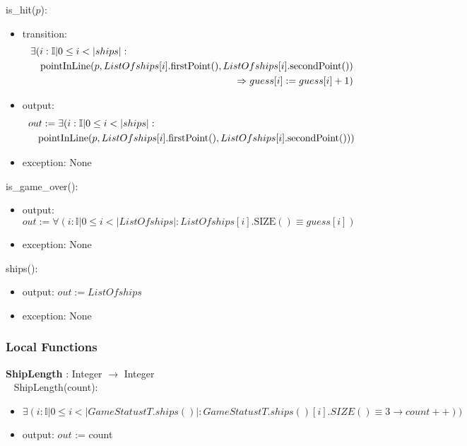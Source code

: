 \documentclass[12pt]{article}
\begin{document}
\noindent is\_hit($p$):
\begin{itemize}


\item transition:
\begin{eqnarray*}
\lefteqn{ \exists( i : \mathbb{I} | 0 \leq i < |ships| :} \\
& &    \mbox{pointInLine}(p, ListOfships[i].\mbox{firstPoint}(), ListOfships[i].\mbox{secondPoint}()) \\
& &    \Rightarrow guess[i] := guess[i] + 1)
\end{eqnarray*}

\item output:
\begin{eqnarray*}
\lefteqn{  out := \exists( i : \mathbb{I} | 0 \leq i < |ships| :} \\
& &    \mbox{pointInLine}(p, ListOfships[i].\mbox{firstPoint}(), ListOfships[i].\mbox{secondPoint}()))
\end{eqnarray*}
\item exception: None
\end{itemize}

\noindent is\_game\_over():
\begin{itemize}
\item output: $out := \forall( i : \mathbb{I} | 0 \leq i < |ListOfships| : ListOfships[i].\mbox{SIZE}() \equiv guess[i])$
\item exception: None
\end{itemize}

\noindent ships():
\begin{itemize}
\item output: $out := ListOfships$
\item exception: None
\end{itemize}

\subsubsection* {Local Functions}


\textbf{ShipLength} : Integer $\rightarrow$ Integer\\

~\newline
ShipLength(count):
~\newline
\begin{itemize}
\item $\exists ( i : \mathbb{I} | 0 \leq i < |GameStatustT.ships()| : GameStatustT.ships()[i].SIZE() \equiv  3 \rightarrow count++))$
\item output: $out$ := count
\end{itemize}
~\newline
\end{document}
